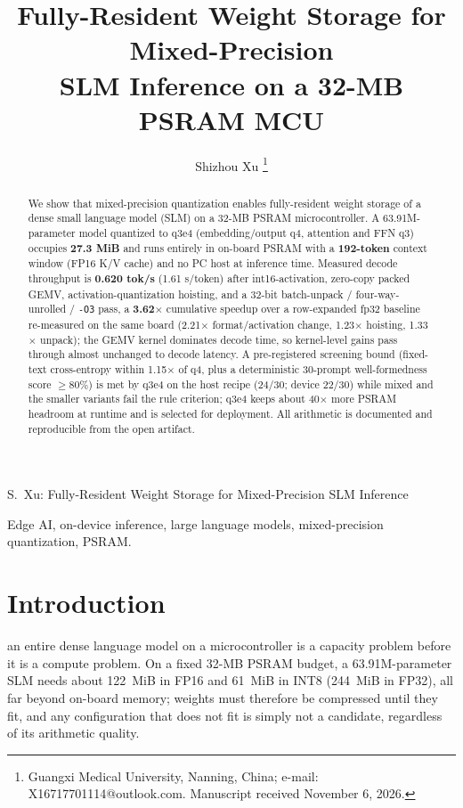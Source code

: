 \documentclass[journal,letterpaper]{IEEEtran}
\begin{document}
\title{Fully-Resident Weight Storage for Mixed-Precision\\ SLM Inference on a 32-MB PSRAM MCU}

\author{Shizhou Xu%
\thanks{Guangxi Medical University, Nanning, China; e-mail: X16717701114@outlook.com.
Manuscript received November 6, 2026.}}

%
{S.~Xu: Fully-Resident Weight Storage for Mixed-Precision SLM Inference}

\maketitle

\begin{abstract}
We show that mixed-precision quantization enables fully-resident weight storage of a dense
small language model (SLM) on a 32-MB PSRAM microcontroller. A 63.91M-parameter model
quantized to q3e4 (embedding/output q4, attention and FFN q3) occupies \textbf{27.3 MiB}
and runs entirely in on-board PSRAM with a \textbf{192-token} context window (FP16 K/V cache)
and no PC host at inference time. Measured decode throughput is \textbf{0.620 tok/s}
(1.61 s/token) after int16-activation, zero-copy packed GEMV, activation-quantization hoisting,
and a 32-bit batch-unpack / four-way-unrolled / \texttt{-O3} pass, a \textbf{3.62$\times$}
cumulative speedup over a row-expanded fp32 baseline re-measured on the same board
(2.21$\times$ format/activation change, 1.23$\times$ hoisting, 1.33$\times$ unpack); the GEMV
kernel dominates decode time, so kernel-level gains pass through almost unchanged to decode
latency. A pre-registered screening bound (fixed-text cross-entropy within 1.15$\times$ of q4,
plus a deterministic 30-prompt well-formedness score $\geq 80\%$) is met by q3e4 on the host
recipe (24/30; device 22/30) while mixed and the smaller variants fail the rule criterion; q3e4
keeps about 40$\times$ more PSRAM headroom at runtime and is selected for deployment. All
arithmetic is documented and reproducible from the open artifact.
\end{abstract}

\begin{IEEEkeywords}
Edge AI, on-device inference, large language models, mixed-precision quantization, PSRAM.
\end{IEEEkeywords}

\section{Introduction}
 an entire dense language model on a microcontroller is a capacity
problem before it is a compute problem. On a fixed 32-MB PSRAM budget, a 63.91M-parameter
SLM needs about 122~MiB in FP16 and 61~MiB in INT8 (244~MiB in FP32), all far beyond on-board memory;
weights must therefore be compressed until they fit, and any configuration that does not fit
is simply not a candidate, regardless of its arithmetic quality.
\end{document}
